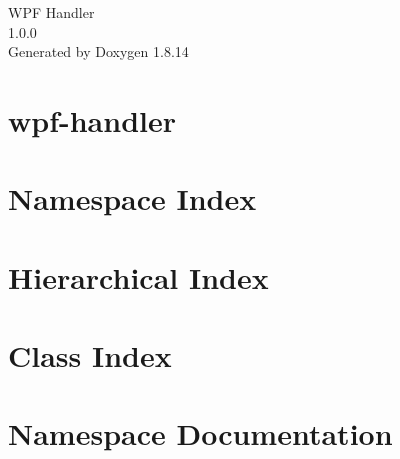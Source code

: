 \documentclass[twoside]{book}
\newcommand{\+}{\discretionary{\mbox{\scriptsize$\hookleftarrow$}}{}{}}
\newcommand{\clearemptydoublepage}{%
  \newpage{\pagestyle{empty}\cleardoublepage}%
}
\begin{document}
\hypersetup{pageanchor=false,
             bookmarksnumbered=true,
             pdfencoding=unicode
            }
\begin{titlepage}
\vspace*{7cm}
\begin{center}%
{\Large W\+PF Handler \\[1ex]\large 1.\+0.\+0 }\\
\vspace*{1cm}
{\large Generated by Doxygen 1.8.14}\\
\end{center}
\end{titlepage}
\clearemptydoublepage
{}
\tableofcontents
\clearemptydoublepage
{}
\hypersetup{pageanchor=true}

\chapter{wpf-\/handler}
\label{md__d_1__work__git_hub_wpf-handler__r_e_a_d_m_e}

\chapter{Namespace Index}

\chapter{Hierarchical Index}

\chapter{Class Index}

\chapter{Namespace Documentation}














\end{document}
